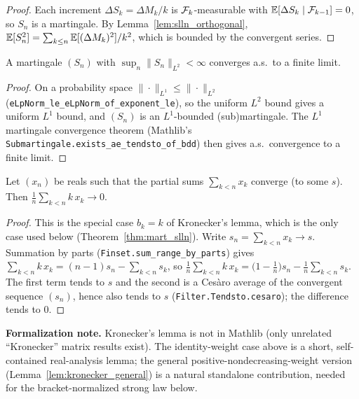 \begin{proof}
Each increment $\Delta S_k = \Delta M_k / k$ is $\mathcal{F}_k$-measurable with
$\mathbb{E}[\Delta S_k\mid\mathcal{F}_{k-1}] = 0$, so $S_n$ is a martingale. By
Lemma~\ref{lem:slln_orthogonal}, $\mathbb{E}[S_n^2] = \sum_{k\le n}\mathbb{E}[(\Delta M_k)^2]/k^2$,
which is bounded by the convergent series.
\end{proof}

\begin{lemma}\label{lem:slln_l2_conv}
\leanok
A martingale $(S_n)$ with $\sup_n \|S_n\|_{L^2} < \infty$ converges a.s.\ to a finite limit.
\end{lemma}

\begin{proof}\leanok
On a probability space $\|\cdot\|_{L^1}\le\|\cdot\|_{L^2}$
(\texttt{eLpNorm\_le\_eLpNorm\_of\_exponent\_le}), so the uniform $L^2$ bound gives a uniform
$L^1$ bound, and $(S_n)$ is an $L^1$-bounded (sub)martingale. The $L^1$ martingale convergence
theorem (Mathlib's \texttt{Submartingale.exists\_ae\_tendsto\_of\_bdd}) then gives a.s.\ convergence
to a finite limit.
\end{proof}

\begin{lemma}\label{lem:kronecker}
\leanok
Let $(x_n)$ be reals such that the partial sums $\sum_{k<n} x_k$ converge (to some $s$). Then
$\frac{1}{n}\sum_{k<n} k\,x_k \to 0$.
\end{lemma}

\begin{proof}\leanok
This is the special case $b_k = k$ of Kronecker's lemma, which is the only case used below
(Theorem~\ref{thm:mart_slln}). Write $s_n = \sum_{k<n} x_k \to s$. Summation by parts
(\texttt{Finset.sum\_range\_by\_parts}) gives
$\sum_{k<n} k\,x_k = (n-1)s_n - \sum_{k<n} s_k$, so
$\frac{1}{n}\sum_{k<n} k\,x_k = \big(1-\tfrac1n\big)s_n - \frac{1}{n}\sum_{k<n} s_k$.
The first term tends to $s$ and the second is a Cesàro average of the convergent sequence $(s_n)$,
hence also tends to $s$ (\texttt{Filter.Tendsto.cesaro}); the difference tends to $0$.
\end{proof}

\textbf{Formalization note.} Kronecker's lemma is not in Mathlib (only unrelated
``Kronecker'' matrix results exist). The identity-weight case above is a short, self-contained
real-analysis lemma; the general positive-nondecreasing-weight version
(Lemma~\ref{lem:kronecker_general}) is a natural standalone contribution, needed for the
bracket-normalized strong law below.

